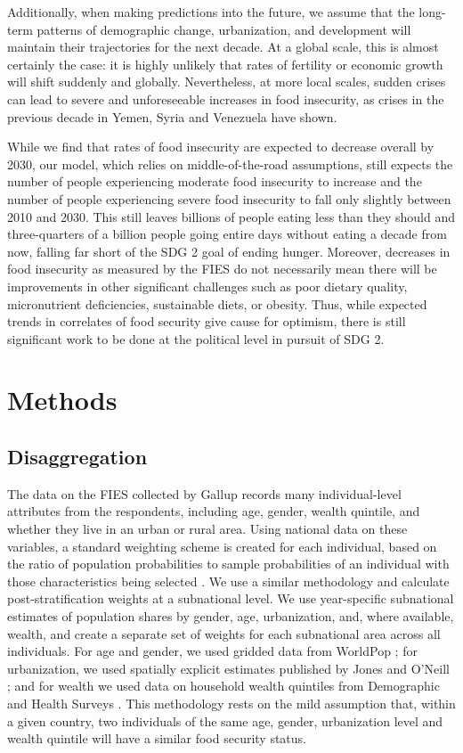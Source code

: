 \documentclass{article}
\begin{document}
Additionally, when making predictions into the future, we assume that the long-term patterns of demographic change, urbanization, and development will maintain their trajectories for the next decade.  At a global scale, this is almost certainly the case: it is highly unlikely that rates of fertility or economic growth will shift suddenly and globally.  Nevertheless, at more local scales, sudden crises can lead to severe and unforeseeable increases in food insecurity, as crises in the previous decade in Yemen, Syria and Venezuela have shown.

While we find that rates of food insecurity are expected to decrease overall by 2030, our model, which relies on middle-of-the-road assumptions, still expects the number of people experiencing moderate food insecurity to increase and the number of people experiencing severe food insecurity to fall only slightly between 2010 and 2030.  This still leaves billions of people eating less than they should and three-quarters of a billion people going entire days without eating a decade from now, falling far short of the SDG 2 goal of ending hunger.  Moreover, decreases in food insecurity as measured by the FIES do not necessarily mean there will be improvements in other significant challenges such as poor dietary quality, micronutrient deficiencies, sustainable diets, or obesity.  Thus, while expected trends in correlates of food security give cause for optimism, there is still significant work to be done at the political level in pursuit of SDG 2.

\section{Methods}
\subsection{Disaggregation}
The data on the FIES collected by Gallup records many individual-level attributes from the respondents, including age, gender, wealth quintile, and whether they live in an urban or rural area.  Using national data on these variables, a standard weighting scheme is created for each individual, based on the ratio of population probabilities to sample probabilities of an individual with those characteristics being selected \citep{bethlehem2009applied}.  We use a similar methodology and calculate post-stratification weights at a subnational level.  We use year-specific subnational estimates of population shares by gender, age, urbanization, and, where available, wealth, and create a separate set of weights for each subnational area across all individuals.  For age and gender, we used gridded data from WorldPop \citep{Tatem2017}; for urbanization, we used spatially explicit estimates published by Jones and O'Neill \citep{Jones2016}; and for wealth we used data on household wealth quintiles from Demographic and Health Surveys \citep{dhsall}.  This methodology rests on the mild assumption that, within a given country, two individuals of the same age, gender, urbanization level and wealth quintile will have a similar food security status.
\end{document}
